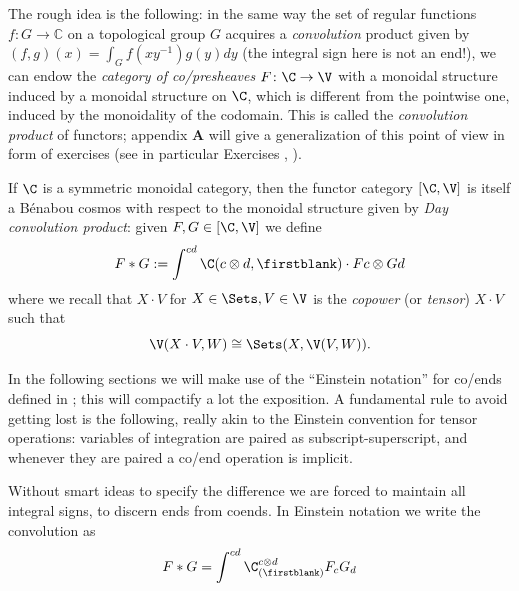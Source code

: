 The rough idea is the following: in the same way the set of regular functions $f \colon G \to \mathbb{C}$ on a topological group $G$ acquires a \emph{convolution} product given by $(f,g)(x) = \int_G f(xy^{-1})g(y)dy$ (the integral sign here is not an end!), we can endow the \emph{category of co/presheaves} $F\colon \C\to\V$ with a monoidal structure induced by a monoidal structure on $\C$, which is different from the pointwise one, induced by the monoidality of the codomain. This is called the \emph{convolution product} of functors; appendix \textbf{A} will give a generalization of this point of view in form of exercises (see in particular Exercises , ).
\begin{definition}\label{day} If $\C$ is a symmetric monoidal category, then the functor category $[\C,\V]$ is itself a B\'enabou cosmos with respect to the monoidal structure given by \emph{Day convolution product}: given $F,G\in[\C,\V]$ we define
\[
F\ast G := \int^{cd}\C(c\otimes d,\firstblank)\cdot Fc\otimes Gd
\] 
where we recall that $X\cdot V$ for $X\in\Sets,V\in \V$ is the \emph{copower} (or \emph{tensor}) $X\cdot V$ such that
\[
\V(X\cdot V,W)\cong \Sets(X, \V(V,W)).
\]
\end{definition}
\begin{notat}
In the following sections we will make use of the ``Einstein notation'' for co/ends defined in ; this will compactify a lot the exposition. A fundamental rule to avoid getting lost is the following, really akin to the Einstein convention for tensor operations: variables of integration are paired as subscript\hyp{}superscript, and whenever they are paired a co/end operation is implicit.

Without smart ideas to specify the difference we are forced to maintain all integral signs, to discern ends from coends. In Einstein notation we write the convolution as
\[
F\ast G = \int^{cd} \C^{c\otimes d}_{(\firstblank)} F_c G_d
\]
\end{notat}
